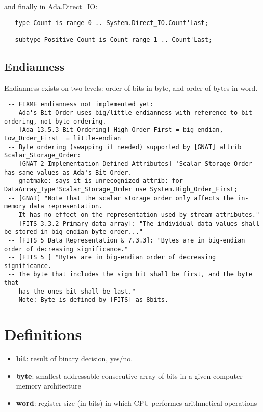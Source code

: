 \documentclass[a4paper,10pt]{article}
\begin{document}
and finally in Ada.Direct\_IO:

\begin{verbatim}
   type Count is range 0 .. System.Direct_IO.Count'Last;

   subtype Positive_Count is Count range 1 .. Count'Last;
\end{verbatim}




\subsection{Endianness}

Endianness exists on two levels: order of bits in byte, 
and order of bytes in word.

\begin{verbatim}
 -- FIXME endianness not implemented yet:
 -- Ada's Bit_Order uses big/little endianness with reference to bit-ordering, not byte ordering.
 -- [Ada 13.5.3 Bit Ordering] High_Order_First = big-endian, Low_Order_First  = little-endian
 -- Byte ordering (swapping if needed) supported by [GNAT] attrib Scalar_Storage_Order:
 -- [GNAT 2 Implementation Defined Attributes] 'Scalar_Storage_Order has same values as Ada's Bit_Order.
 -- gnatmake: says it is unrecognized attrib: for DataArray_Type'Scalar_Storage_Order use System.High_Order_First;
 -- [GNAT] "Note that the scalar storage order only affects the in-memory data representation.
 -- It has no effect on the representation used by stream attributes."
 -- [FITS 3.3.2 Primary data array]: "The individual data values shall be stored in big-endian byte order..."
 -- [FITS 5 Data Representation & 7.3.3]: "Bytes are in big-endian order of decreasing significance."
 -- [FITS 5 ] "Bytes are in big-endian order of decreasing significance.
 -- The byte that includes the sign bit shall be first, and the byte that
 -- has the ones bit shall be last."
 -- Note: Byte is defined by [FITS] as 8bits.
\end{verbatim}

\section{Definitions}

\begin{itemize}
\item \textbf{bit}: result of binary decision, yes/no.
\item \textbf{byte}: smallest addressable consecutive array of bits in a given computer memory architecture
\item \textbf{word}: register size (in bits) in which CPU performes arithmetical operations
\end{itemize}
\end{document}
